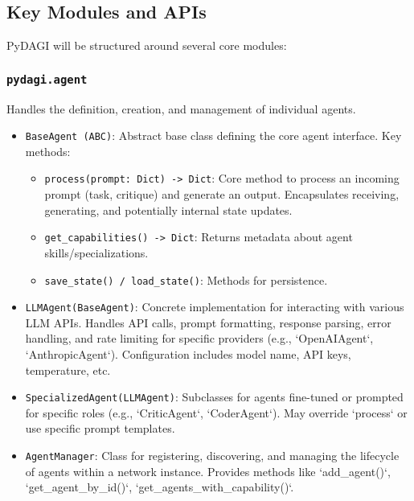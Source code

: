 \documentclass[12pt]{amsart}
\begin{document}
\subsection{Key Modules and APIs}
PyDAGI will be structured around several core modules:

\subsubsection{\texttt{pydagi.agent}}
Handles the definition, creation, and management of individual agents.
\begin{itemize}[leftmargin=*]
    \item \texttt{BaseAgent (ABC)}: Abstract base class defining the core agent interface. Key methods:
        \begin{itemize}
            \item \texttt{process(prompt: Dict) -> Dict}: Core method to process an incoming prompt (task, critique) and generate an output. Encapsulates receiving, generating, and potentially internal state updates.
            \item \texttt{get_capabilities() -> Dict}: Returns metadata about agent skills/specializations.
            \item \texttt{save_state() / load_state()}: Methods for persistence.
        \end{itemize}
    \item \texttt{LLMAgent(BaseAgent)}: Concrete implementation for interacting with various LLM APIs. Handles API calls, prompt formatting, response parsing, error handling, and rate limiting for specific providers (e.g., `OpenAIAgent`, `AnthropicAgent`). Configuration includes model name, API keys, temperature, etc.
    \item \texttt{SpecializedAgent(LLMAgent)}: Subclasses for agents fine-tuned or prompted for specific roles (e.g., `CriticAgent`, `CoderAgent`). May override `process` or use specific prompt templates.
    \item \texttt{AgentManager}: Class for registering, discovering, and managing the lifecycle of agents within a network instance. Provides methods like `add_agent()`, `get_agent_by_id()`, `get_agents_with_capability()`.
\end{itemize}
\end{document}
